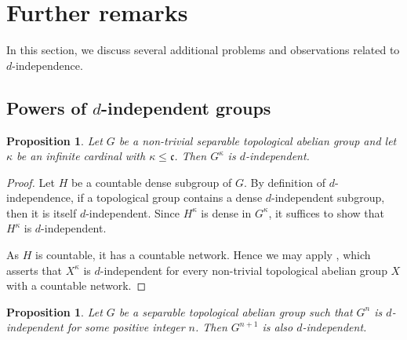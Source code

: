 \documentclass[12pt]{amsart}
\newtheorem{proposition}[theorem]{Proposition}
\theoremstyle{definition}
\theoremstyle{remark}
\begin{document}
\section{Further remarks}\label{S3}

In this section, we discuss several additional problems and observations related to $d$-independence.


\subsection{Powers of $d$-independent groups}
\begin{proposition}\label{Prop:InfP}
Let $G$ be a non-trivial separable topological abelian group and let
$\kappa$ be an infinite cardinal with $\kappa\leq \mathfrak{c}$.
Then $G^\kappa$ is $d$-independent.
\end{proposition}

\begin{proof}
Let $H$ be a countable dense subgroup of $G$.
By definition of $d$-independence, if a topological group contains a dense
$d$-independent subgroup, then it is itself $d$-independent.
Since $H^\kappa$ is dense in $G^\kappa$, it suffices to show that
$H^\kappa$ is $d$-independent.

As $H$ is countable, it has a countable network.
Hence we may apply \cite[Theorem~3.7]{MT}, which asserts that $X^\kappa$
is $d$-independent for every non-trivial topological abelian group $X$
with a countable network.
\end{proof}

\begin{proposition}\label{n+1}
Let $G$ be a separable topological abelian group such that $G^n$ is
$d$-independent for some positive integer $n$.
Then $G^{n+1}$ is also $d$-independent.
\end{proposition}
\end{document}
